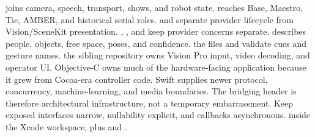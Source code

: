 \markdownRendererUlItem {}  joins camera, speech, transport, shows, and robot state.\markdownRendererUlItemEnd 
\markdownRendererUlItem {}  reaches Base, Maestro, Tic, AMBER, and historical serial roles.\markdownRendererUlItemEnd 
\markdownRendererUlItem {}  and  separate provider lifecycle from Vision/SceneKit presentation.\markdownRendererUlItemEnd 
\markdownRendererUlItem {} , , and  keep provider concerns separate.\markdownRendererUlItemEnd 
\markdownRendererUlItem {}  describes people, objects, free space, poses, and confidence.\markdownRendererUlItemEnd 
\markdownRendererUlItem {} the  files and  validate cues and gesture names.\markdownRendererUlItemEnd 
\markdownRendererUlItem {} the sibling  repository owns Vision Pro input, video decoding, and operator UI.\markdownRendererUlItemEnd 
\markdownRendererUlEnd \markdownRendererInterblockSeparator
{}Objective-C owns much of the hardware-facing application because it grew from Cocoa-era controller code. Swift supplies newer protocol, concurrency, machine-learning, and media boundaries. The bridging header is therefore architectural infrastructure, not a temporary embarrassment. Keep exposed interfaces narrow, nullability explicit, and callbacks asynchronous.\markdownRendererInterblockSeparator
{}
\markdownRendererSectionEnd \markdownRendererSectionBegin
{}\markdownRendererInterblockSeparator
{}\markdownRendererBlockQuoteBegin
{}  inside the Xcode workspace, plus  and .\markdownRendererBlockQuoteEnd \markdownRendererInterblockSeparator
